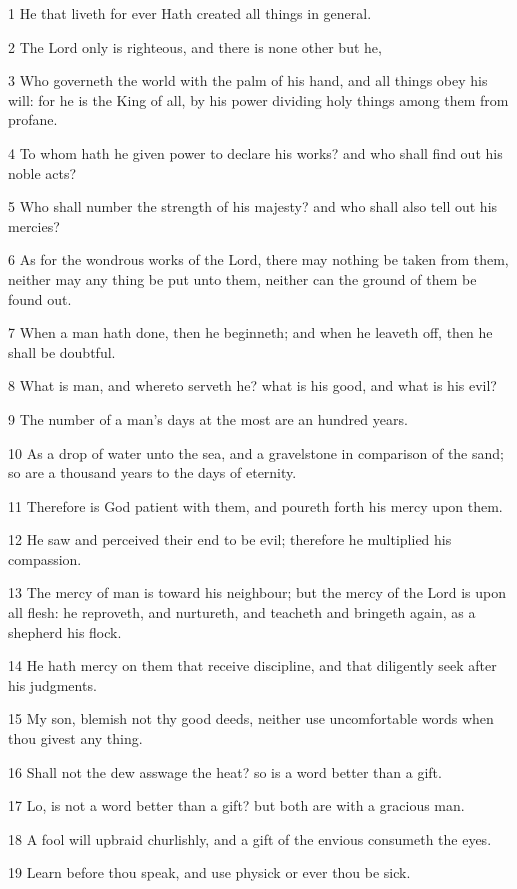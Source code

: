 \par 1 He that liveth for ever Hath created all things in general.
\par 2 The Lord only is righteous, and there is none other but he,
\par 3 Who governeth the world with the palm of his hand, and all things obey his will: for he is the King of all, by his power dividing holy things among them from profane.
\par 4 To whom hath he given power to declare his works? and who shall find out his noble acts?
\par 5 Who shall number the strength of his majesty? and who shall also tell out his mercies?
\par 6 As for the wondrous works of the Lord, there may nothing be taken from them, neither may any thing be put unto them, neither can the ground of them be found out.
\par 7 When a man hath done, then he beginneth; and when he leaveth off, then he shall be doubtful.
\par 8 What is man, and whereto serveth he? what is his good, and what is his evil?
\par 9 The number of a man's days at the most are an hundred years.
\par 10 As a drop of water unto the sea, and a gravelstone in comparison of the sand; so are a thousand years to the days of eternity.
\par 11 Therefore is God patient with them, and poureth forth his mercy upon them.
\par 12 He saw and perceived their end to be evil; therefore he multiplied his compassion.
\par 13 The mercy of man is toward his neighbour; but the mercy of the Lord is upon all flesh: he reproveth, and nurtureth, and teacheth and bringeth again, as a shepherd his flock.
\par 14 He hath mercy on them that receive discipline, and that diligently seek after his judgments.
\par 15 My son, blemish not thy good deeds, neither use uncomfortable words when thou givest any thing.
\par 16 Shall not the dew asswage the heat? so is a word better than a gift.
\par 17 Lo, is not a word better than a gift? but both are with a gracious man.
\par 18 A fool will upbraid churlishly, and a gift of the envious consumeth the eyes.
\par 19 Learn before thou speak, and use physick or ever thou be sick.

